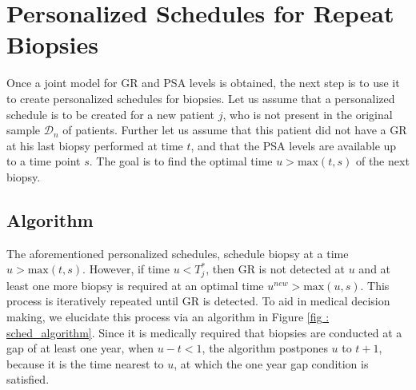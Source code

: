 \section{Personalized Schedules for Repeat Biopsies}
\label{sec : pers_sched_approaches}
Once a joint model for GR and PSA levels is obtained, the next step is to use it to create personalized schedules for biopsies. Let us assume that a personalized schedule is to be created for a new patient $j$, who is not present in the original sample $\mathcal{D}_n$ of patients. Further let us assume that this patient did not have a GR at his last biopsy performed at time $t$, and that the PSA levels are available up to a time point $s$. The goal is to find the optimal time $u > \mbox{max}(t,s)$ of the next biopsy. 





\subsection{Algorithm}
\label{subsec : pers_sched_algorithm}
The aforementioned personalized schedules, schedule biopsy at a time $u > \mbox{max}(t,s)$. However, if time $u < T^*_j$, then GR is not detected at $u$ and at least one more biopsy is required at an optimal time $u^{new} > \mbox{max}(u,s)$. This process is iteratively repeated until GR is detected. To aid in medical decision making, we elucidate this process via an algorithm in Figure \ref{fig : sched_algorithm}. Since it is medically required that biopsies are conducted at a gap of at least one year, when $u - t < 1$, the algorithm postpones $u$ to $t + 1$, because it is the time nearest to $u$, at which the one year gap condition is satisfied.



